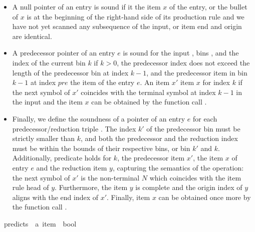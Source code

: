 \begin{isabellebody}
\begin{isamarkuptext}
\begin{itemize}
  \item A null pointer  of an entry is sound if it  the item $x$ of
    the entry, or the bullet of $x$ is at the beginning of the right-hand side of its production rule
    and we have not yet scanned any subsequence of the input, or item end and origin are identical.
  \item A predecessor pointer  of an entry $e$ is sound for the input \isa{{\isasymomega}}, bins ,
    and the index of the current bin $k$ if $k > 0$, the predecessor index does not exceed the length
    of the predecessor bin at index $k-1$, and the predecessor item in bin $k-1$ at index $pre$ 
    the item of the entry $e$. An item $x'$  item $x$ for index $k$ if the next symbol of
    $x'$ coincides with the terminal symbol at index $k-1$ in the input \isa{{\isasymomega}} and the item $x$ can be obtained by the function call
    . 
  \item Finally, we define the soundness of a pointer  of an entry $e$ for each predecessor/reduction
    triple . The index $k'$ of the predecessor bin must be strictly
    smaller than $k$, and both the predecessor and the reduction index must be within the bounds of their
    respective bins, or bin $k'$ and $k$. Additionally, predicate  holds for $k$,
    the predecessor item $x'$, the item $x$ of entry $e$ and the reduction item $y$, capturing the semantics of
    the  operation: the next symbol of $x'$ is the non-terminal $N$ which coincides
    with the item rule head of $y$. Furthermore, the item $y$ is complete and the origin index of $y$
    aligns with the end index of $x'$. Finally, item $x$ can be obtained once more by the function call .
\end{itemize}%
\end{isamarkuptext}\isamarkuptrue%
\isamarkupfalse%
\ predicts\ {\isacharcolon}{\kern0pt}{\isacharcolon}{\kern0pt}\ {\isachardoublequoteopen}{\isacharprime}{\kern0pt}a\ item\ {\isasymRightarrow}\ bool{\isachardoublequoteclose}\ \isanewline

\end{isabellebody}
